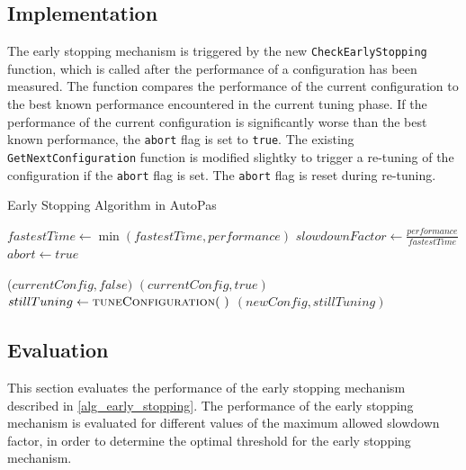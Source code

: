 \documentclass[conference]{IEEEtran}
\begin{document}
\subsection{Implementation}
The early stopping mechanism is triggered by the new \texttt{CheckEarlyStopping} function, which is called after the performance of a configuration has been measured. The function compares the performance of the current configuration to the best known performance encountered in the current tuning phase. If the performance of the current configuration is significantly worse than the best known performance, the \texttt{abort} flag is set to \texttt{true}. The existing \texttt{GetNextConfiguration} function is modified slightky to trigger a re-tuning of the configuration if the \texttt{abort} flag is set. The \texttt{abort} flag is reset during re-tuning.



\begin{algorithm}[H]
    \small
    \caption{Early Stopping Algorithm in AutoPas}
    \label{alg_early_stopping}
    \begin{algorithmic}[1]
        \State $fastestTime \gets \min(fastestTime, performance)$
        \State $slowdownFactor \gets \frac{performance}{fastestTime}$
        \State $abort \gets true$
        \EndIf
        \EndProcedure

        \vspace{0.5em}

        \State \Return ($currentConfig, false)$
            \State \Return $(currentConfig, true)$
            \Else
            \State $stillTuning \gets \Call{tuneConfiguration}{~}$
            \State \Return $(newConfig, stillTuning)$
        \EndIf
        \EndProcedure
    \end{algorithmic}

\end{algorithm}



\subsection{Evaluation}
\label{sec:optimal_threshold}

This section evaluates the performance of the early stopping mechanism described in \autoref{alg_early_stopping}. The performance of the early stopping mechanism is evaluated for different values of the maximum allowed slowdown factor, in order to determine the optimal threshold for the early stopping mechanism.
\end{document}
